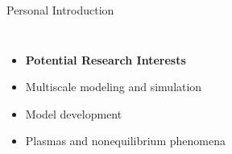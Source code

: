 \documentclass{beamer}
\begin{document}
\begin{frame}[t]{Personal Introduction}
\begin{columns}
		\end{columns}
		\begin{columns}
			\begin{itemize}
				\item[] \textbf{Potential Research Interests}
				\vspace{0.5em}
				\item Multiscale modeling and simulation
				\vspace{0.5em}
				\item Model development
				\vspace{0.5em}
				\item Plasmas and nonequilibrium phenomena
			\end{itemize}
		\end{columns}
	\end{frame}
	
\end{document}
